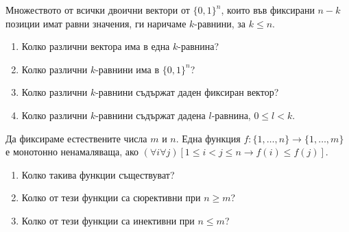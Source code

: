 \begin{problem}
  Множеството от всички двоични вектори от $\{0,1\}^{n}$, които във фиксирани $n-k$ позиции имат равни значения,
  ги наричаме $k$-равнини, за $k\leq n$.
  \begin{enumerate}
  \item
    Колко различни вектора има в една $k$-равнина?
  \item
    Колко различни $k$-равнини има в $\{0,1\}^{n}$?
  \item
    Колко различни $k$-равнини съдържат даден фиксиран вектор?
  \item
    Колко различни $k$-равнини съдържат дадена $l$-равнина, $0\leq l < k$.
  \end{enumerate}
\end{problem}


\begin{problem}
  Да фиксираме естествените числа $m$ и $n$.
  Една функция $f:\{1,\dots,n\}\to\{1,\dots,m\}$ е монотонно ненамаляваща, ако
  $(\forall i\forall j)[1\leq i<j\leq n \rightarrow f(i)\leq f(j) ]$.
  \begin{enumerate}
  \item
    Колко такива функции съществуват?
  \item
    Колко от тези функции са сюрективни при $n\geq m$?
  \item
    Колко от тези функции са инективни при $n\leq m$?
\end{enumerate}
\end{problem}

